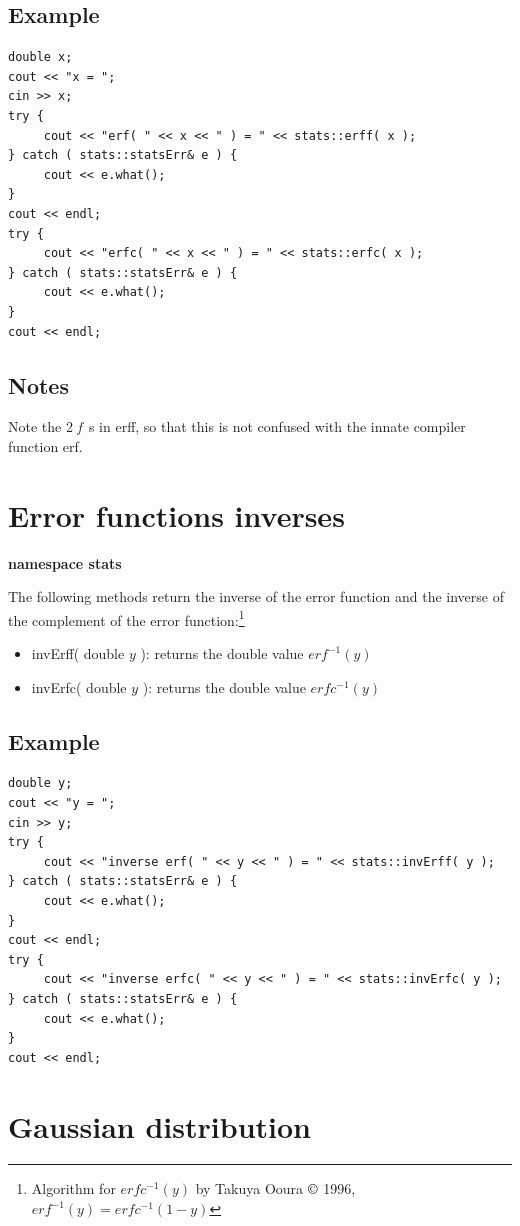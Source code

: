 \documentclass{report}
\begin{document}
\subsection{Example}
\begin{verbatim}
double x;
cout << "x = ";
cin >> x;
try {
     cout << "erf( " << x << " ) = " << stats::erff( x );
} catch ( stats::statsErr& e ) {
     cout << e.what();
}
cout << endl;
try {
     cout << "erfc( " << x << " ) = " << stats::erfc( x );
} catch ( stats::statsErr& e ) {
     cout << e.what();
}
cout << endl;
\end{verbatim}

\subsection{Notes}
Note the 2 {\em f}~s in erff, so that this is not confused with the
innate compiler function erf.

\section{Error functions inverses}

{\bf namespace stats}

The following methods return the inverse of the error function and the
inverse of the complement of the error function:\footnote{Algorithm
for $erfc^{-1}(y)$ by Takuya Ooura $\copyright$ 1996,
$erf^{-1}(y) = erfc^{-1}(1-y)$}

\begin{itemize}
\item invErff( double $y$ ): returns the double value $erf^{-1}(y)$
\item invErfc( double $y$ ): returns the double value $erfc^{-1}(y)$
\end{itemize}

\subsection{Example}
\begin{verbatim}
double y;
cout << "y = ";
cin >> y;
try {
     cout << "inverse erf( " << y << " ) = " << stats::invErff( y );
} catch ( stats::statsErr& e ) {
     cout << e.what();
}
cout << endl;
try {
     cout << "inverse erfc( " << y << " ) = " << stats::invErfc( y );
} catch ( stats::statsErr& e ) {
     cout << e.what();
}
cout << endl;
\end{verbatim}

\section{Gaussian distribution}
\end{document}
